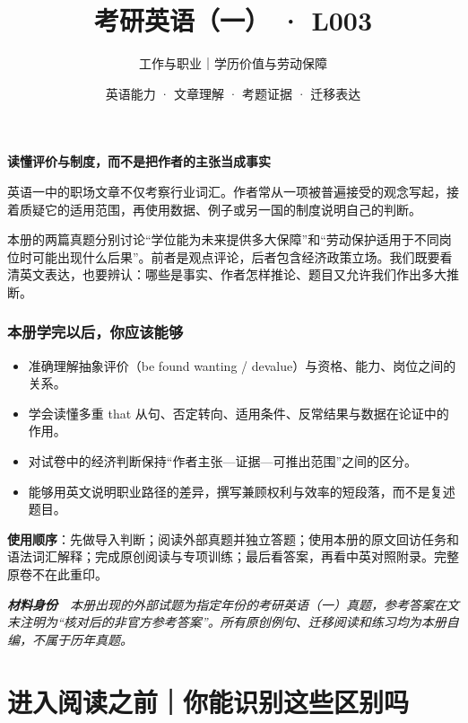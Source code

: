 \documentclass[
  11pt,
]{ctexart}
\title{考研英语（一） · L003}
\subtitle{工作与职业｜学历价值与劳动保障}
\author{英语能力 · 文章理解 · 考题证据 · 迁移表达}
\date{}
\renewenvironment{quote}{\begin{tcolorbox}[enhanced,breakable,colback=sand,colframe=primary!22,boxrule=0.4pt,arc=2pt,left=2.6mm,right=2.6mm,top=1.6mm,bottom=1.6mm]\itshape}{\end{tcolorbox}}
\begin{document}
\maketitle

{
\setcounter{tocdepth}{2}
\tableofcontents
}
\textbf{读懂评价与制度，而不是把作者的主张当成事实}

英语一中的职场文章不仅考察行业词汇。作者常从一项被普遍接受的观念写起，接着质疑它的适用范围，再使用数据、例子或另一国的制度说明自己的判断。

本册的两篇真题分别讨论``学位能为未来提供多大保障''和``劳动保护适用于不同岗位时可能出现什么后果''。前者是观点评论，后者包含经济政策立场。我们既要看清英文表达，也要辨认：哪些是事实、作者怎样推论、题目又允许我们作出多大推断。

\subsubsection{本册学完以后，你应该能够}\label{ux672cux518cux5b66ux5b8cux4ee5ux540eux4f60ux5e94ux8be5ux80fdux591f}

\begin{itemize}
\item
  准确理解抽象评价（be found wanting /
  devalue）与资格、能力、岗位之间的关系。
\item
  学会读懂多重 that
  从句、否定转向、适用条件、反常结果与数据在论证中的作用。
\item
  对试卷中的经济判断保持``作者主张---证据---可推出范围''之间的区分。
\item
  能够用英文说明职业路径的差异，撰写兼顾权利与效率的短段落，而不是复述题目。
\end{itemize}

\textbf{使用顺序}：先做导入判断；阅读外部真题并独立答题；使用本册的原文回访任务和语法词汇解释；完成原创阅读与专项训练；最后看答案，再看中英对照附录。完整原卷不在此重印。

\begin{quote}
\textbf{材料身份}　本册出现的外部试题为指定年份的考研英语（一）真题，参考答案在文末注明为``核对后的非官方参考答案''。所有原创例句、迁移阅读和练习均为本册自编，不属于历年真题。
\end{quote}

\section{进入阅读之前｜你能识别这些区别吗}\label{ux8fdbux5165ux9605ux8bfbux4e4bux524dux4f60ux80fdux8bc6ux522bux8fd9ux4e9bux533aux522bux5417}
\end{document}
